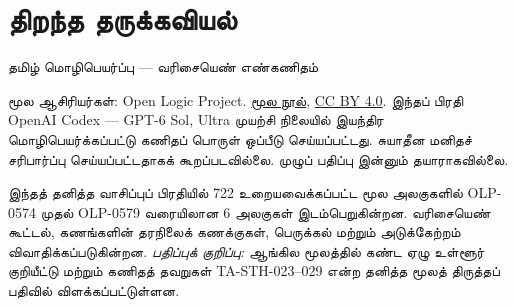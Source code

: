 \documentclass[11pt,a4paper,openany]{memoir}
\begin{document}
\let\Olref\olref
\raggedright
\pagestyle{plain}
\chapter*{திறந்த தருக்கவியல்}
\noindent தமிழ் மொழிபெயர்ப்பு — வரிசையெண் எண்கணிதம்

\noindent மூல ஆசிரியர்கள்: Open Logic Project.
\href{https://github.com/OpenLogicProject/OpenLogic}{மூல நூல்},
\href{https://creativecommons.org/licenses/by/4.0/}{CC BY 4.0}.
இந்தப் பிரதி OpenAI Codex — GPT-6 Sol, Ultra முயற்சி நிலையில்
இயந்திர மொழிபெயர்க்கப்பட்டு கணிதப் பொருள் ஒப்பீடு செய்யப்பட்டது.
சுயாதீன மனிதச் சரிபார்ப்பு செய்யப்பட்டதாகக் கூறப்படவில்லை.
முழுப் பதிப்பு இன்னும் தயாராகவில்லை.

\noindent இந்தத் தனித்த வாசிப்புப் பிரதியில் 722 உறையவைக்கப்பட்ட மூல
அலகுகளில் OLP-0574 முதல் OLP-0579 வரையிலான 6 அலகுகள் இடம்பெறுகின்றன.
வரிசையெண் கூட்டல், கணங்களின் தரநிலைக் கணக்குகள், பெருக்கல் மற்றும்
அடுக்கேற்றம் விவாதிக்கப்படுகின்றன.
\emph{பதிப்புக் குறிப்பு:} ஆங்கில மூலத்தில் கண்ட ஏழு உள்ளூர்
குறியீட்டு மற்றும் கணிதத் தவறுகள் TA-STH-023--029 என்ற தனித்த
மூலத் திருத்தப் பதிவில் விளக்கப்பட்டுள்ளன.

\clearpage
\tableofcontents*



\end{document}
